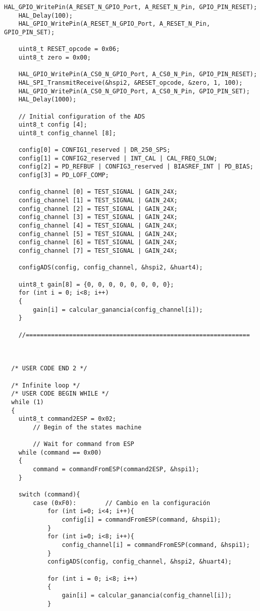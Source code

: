 \begin{lstlisting}[label=algoritmo:main.c,style = STM-code,frame=single,caption=main.c]
	HAL_GPIO_WritePin(A_RESET_N_GPIO_Port, A_RESET_N_Pin, GPIO_PIN_RESET);
	HAL_Delay(100);
	HAL_GPIO_WritePin(A_RESET_N_GPIO_Port, A_RESET_N_Pin, GPIO_PIN_SET);
	
	uint8_t RESET_opcode = 0x06;
	uint8_t zero = 0x00;
	
	HAL_GPIO_WritePin(A_CS0_N_GPIO_Port, A_CS0_N_Pin, GPIO_PIN_RESET);
	HAL_SPI_TransmitReceive(&hspi2, &RESET_opcode, &zero, 1, 100);
	HAL_GPIO_WritePin(A_CS0_N_GPIO_Port, A_CS0_N_Pin, GPIO_PIN_SET);
	HAL_Delay(1000);
	
	// Initial configuration of the ADS
	uint8_t config [4];
	uint8_t config_channel [8];
	
	config[0] = CONFIG1_reserved | DR_250_SPS;
	config[1] = CONFIG2_reserved | INT_CAL | CAL_FREQ_SLOW;
	config[2] = PD_REFBUF | CONFIG3_reserved | BIASREF_INT | PD_BIAS;
	config[3] = PD_LOFF_COMP;
	
	config_channel [0] = TEST_SIGNAL | GAIN_24X;
	config_channel [1] = TEST_SIGNAL | GAIN_24X;
	config_channel [2] = TEST_SIGNAL | GAIN_24X;
	config_channel [3] = TEST_SIGNAL | GAIN_24X;
	config_channel [4] = TEST_SIGNAL | GAIN_24X;
	config_channel [5] = TEST_SIGNAL | GAIN_24X;
	config_channel [6] = TEST_SIGNAL | GAIN_24X;
	config_channel [7] = TEST_SIGNAL | GAIN_24X;
	
	configADS(config, config_channel, &hspi2, &huart4);
	
	uint8_t gain[8] = {0, 0, 0, 0, 0, 0, 0, 0};
	for (int i = 0; i<8; i++)
	{
		gain[i] = calcular_ganancia(config_channel[i]);
	}
	
	//==============================================================



  /* USER CODE END 2 */

  /* Infinite loop */
  /* USER CODE BEGIN WHILE */
  while (1)
  {
	uint8_t command2ESP = 0x02;
		// Begin of the states machine
		
		// Wait for command from ESP
	while (command == 0x00)
	{
		command = commandFromESP(command2ESP, &hspi1);
	}
	
	switch (command){
		case (0xF0):		// Cambio en la configuración
			for (int i=0; i<4; i++){
				config[i] = commandFromESP(command, &hspi1);
			}
			for (int i=0; i<8; i++){
				config_channel[i] = commandFromESP(command, &hspi1);
			}
			configADS(config, config_channel, &hspi2, &huart4);
			
			for (int i = 0; i<8; i++)
			{
				gain[i] = calcular_ganancia(config_channel[i]);
			}
			

\end{lstlisting}

